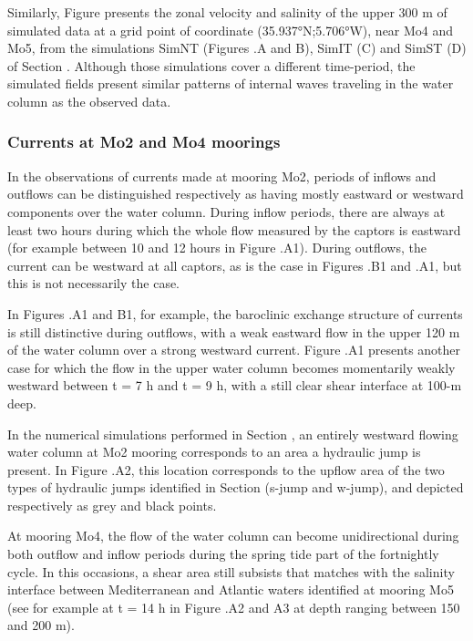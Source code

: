 Similarly, Figure  presents the zonal velocity and salinity of the upper 300 m of simulated data at a grid point of coordinate (35.937°N;5.706°W), near Mo4 and Mo5, from the simulations SimNT (Figures .A and B), SimIT (C) and SimST (D) of Section . Although those simulations cover a different time-period, the simulated fields present similar patterns of internal waves traveling in the water column as the observed data.


\subsubsection{Currents at Mo2 and Mo4 moorings}

In the observations of currents made at mooring Mo2, periods of inflows and outflows can be distinguished respectively as having mostly eastward or westward components over the water column. During inflow periods, there are always at least two hours during which the whole flow measured by the captors is eastward (for example between 10 and 12 hours in Figure .A1). During outflows, the current can be westward at all captors, as is the case in Figures .B1 and .A1, but this is not necessarily the case. 

In Figures .A1 and B1, for example, the baroclinic exchange structure of currents is still distinctive during outflows, with a weak eastward flow in the upper 120 m of the water column over a strong westward current. Figure .A1 presents another case for which the flow in the upper water column becomes momentarily weakly westward between t = 7 h and t = 9 h, with a still clear shear interface at 100-m deep.

In the numerical simulations performed in Section , an entirely westward flowing water column at Mo2 mooring corresponds to an area a hydraulic jump is present. In Figure .A2, this location corresponds to the upflow area of the two types of hydraulic jumps identified in Section  (s-jump and w-jump), and depicted respectively as grey and black points.

At mooring Mo4, the flow of the water column can become unidirectional during both outflow and inflow periods during the spring tide part of the fortnightly cycle. In this occasions, a shear area still subsists that matches with the salinity interface between Mediterranean and Atlantic waters identified at mooring Mo5 (see for example at t = 14 h in Figure .A2 and A3 at depth ranging between 150 and 200 m).


